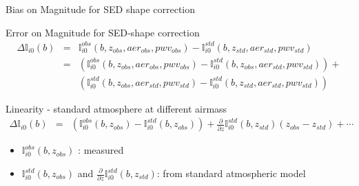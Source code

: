 \documentclass{beamer}
\begin{document}
\begin{frame}{Bias on Magnitude for SED shape correction}
\begin{block}{Error on Magnitude for SED-shape correction}
\begin{eqnarray}
\Delta \mathbb{I}_{i0}(b) & = &  \mathbb{I}_{i0}^{obs}(b,z_{obs},aer_{obs},pwv_{obs}) - \mathbb{I}_{i0}^{std}(b,z_{std},aer_{std},pwv_{std}) \nonumber \\
& = & \left(\mathbb{I}_{i0}^{obs}(b,z_{obs},aer_{obs},pwv_{obs}) - \mathbb{I}_{i0}^{std}(b,z_{obs},aer_{std},pwv_{std})\right) +  \nonumber \\
& & \left(\mathbb{I}_{i0}^{std}(b,z_{obs},aer_{std},pwv_{std}) - \mathbb{I}_{i0}^{std}(b,z_{std},aer_{std},pwv_{std})\right)  \nonumber 
\end{eqnarray}
\end{block}

\begin{alertblock}{Linearity - standard atmosphere at different airmass}
\begin{eqnarray}
\Delta \mathbb{I}_{i0}(b) & = & \left(\mathbb{I}_{i0}^{obs}(b,z_{obs}) - \mathbb{I}_{i0}^{std}(b,z_{obs})\right) + \frac{\partial}{\partial z}\mathbb{I}_{i0}^{std}(b,z_{std})(z_{obs}-z_{std}) + \cdots \nonumber
\end{eqnarray}
\end{alertblock}
\begin{itemize}
\item $\mathbb{I}_{i0}^{obs}(b,z_{obs})$ : measured
\item $\mathbb{I}_{i0}^{std}(b,z_{obs})$ and $\frac{\partial}{\partial z}\mathbb{I}_{i0}^{std}(b,z_{std})$: from standard atmospheric model
\end{itemize}
\end{frame}
\end{document}
